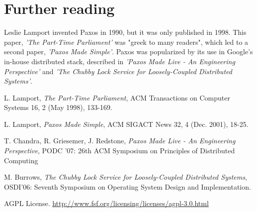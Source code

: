 \documentclass[12pt]{article}
\begin{document}
\section{ Further reading }

Leslie Lamport invented Paxos in 1990, but it was only published in 1998. This paper, \emph{'The Part-Time Parliament'} was "greek to many readers", which led to a second paper, \emph{'Paxos Made Simple'}. Paxos was popularized by its use in Google's in-house distributed stack, described in \emph{'Paxos Made Live - An Engineering Perspective'} and \emph{'The Chubby Lock Service for Loosely-Coupled Distributed Systems'}.

\begin{thebibliography}{9}

L. Lamport, \emph{The Part-Time Parliament}, ACM Transactions on Computer Systems 16, 2 (May 1998), 133-169.

L. Lamport, \emph{Paxos Made Simple}, ACM SIGACT News 32, 4 (Dec. 2001), 18-25.

T. Chandra, R. Griesemer, J. Redstone, \emph{Paxos Made Live - An Engineering Perspective}, PODC '07: 26th ACM Symposium on Principles of Distributed Computing

M. Burrows, \emph{The Chubby Lock Service for Loosely-Coupled Distributed Systems}, OSDI'06: Seventh Symposium on Operating System Design and Implementation.

AGPL License. \url{http://www.fsf.org/licensing/licenses/agpl-3.0.html}

\end{thebibliography}
\end{document}
